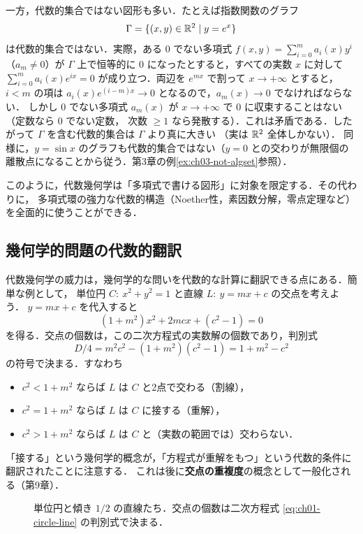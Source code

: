 一方，代数的集合ではない図形も多い．たとえば指数関数のグラフ
\[
  \Gamma=\{(x,y)\in\mathbb{R}^2\mid y=e^x\}
\]
は代数的集合ではない．実際，ある $0$ でない多項式 $f(x,y)=\sum_{i=0}^m a_i(x)y^i$（$a_m\neq0$）が
$\Gamma$ 上で恒等的に $0$ になったとすると，すべての実数 $x$ に対して
$\sum_{i=0}^m a_i(x)e^{ix}=0$ が成り立つ．両辺を $e^{mx}$ で割って $x\to+\infty$ とすると，
$i<m$ の項は $a_i(x)e^{(i-m)x}\to0$ となるので，$a_m(x)\to 0$ でなければならない．
しかし $0$ でない多項式 $a_m(x)$ が $x\to+\infty$ で $0$ に収束することはない（定数なら $0$ でない定数，
次数 $\ge1$ なら発散する）．これは矛盾である．したがって $\Gamma$ を含む代数的集合は $\Gamma$ より真に大きい
（実は $\mathbb{R}^2$ 全体しかない）．
同様に，$y=\sin x$ のグラフも代数的集合ではない（$y=0$ との交わりが無限個の離散点になることから従う．第3章の例\ref{ex:ch03-not-algset}参照）．

このように，代数幾何学は「多項式で書ける図形」に対象を限定する．その代わりに，
多項式環の強力な代数的構造（Noether性，素因数分解，零点定理など）を全面的に使うことができる．

\subsection{幾何学的問題の代数的翻訳}

代数幾何学の威力は，幾何学的な問いを代数的な計算に翻訳できる点にある．簡単な例として，
単位円 $C:\ x^2+y^2=1$ と直線 $L:\ y=mx+c$ の交点を考えよう．
$y=mx+c$ を代入すると
\begin{equation}\label{eq:ch01-circle-line}
  (1+m^2)x^2+2mcx+(c^2-1)=0
\end{equation}
を得る．交点の個数は，この二次方程式の実数解の個数であり，判別式
\[
  D/4=m^2c^2-(1+m^2)(c^2-1)=1+m^2-c^2
\]
の符号で決まる．すなわち
\begin{itemize}
  \item $c^2<1+m^2$ ならば $L$ は $C$ と2点で交わる（割線），
  \item $c^2=1+m^2$ ならば $L$ は $C$ に接する（重解），
  \item $c^2>1+m^2$ ならば $L$ は $C$ と（実数の範囲では）交わらない．
\end{itemize}
「接する」という幾何学的概念が，「方程式が重解をもつ」という代数的条件に翻訳されたことに注意する．
これは後に\textbf{交点の重複度}の概念として一般化される（第9章）．

\begin{figure}[H]
\centering
{}
\caption{単位円と傾き $1/2$ の直線たち．交点の個数は二次方程式 \eqref{eq:ch01-circle-line} の判別式で決まる．}
\label{fig:ch01-circle-line}
\end{figure}

